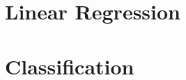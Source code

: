 \documentclass{article}
\begin{document}
\setlength{\parindent}{0em} 

\newpage

\tableofcontents
\newpage


\section{Linear Regression} \label{sec:linear_regression}




\section{Classification} \label{sec:logistic_regression}


%




\newpage
 

\end{document}
